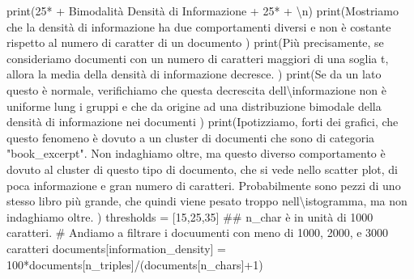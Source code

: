 \documentclass[
  italian,
  a4paper,
]{article}
\newenvironment{Shaded}{\begin{snugshade}}{\end{snugshade}}
\newcommand{\BuiltInTok}[1]{\textcolor[rgb]{0.00,0.23,0.31}{#1}}
\newcommand{\CharTok}[1]{\textcolor[rgb]{0.13,0.47,0.30}{#1}}
\newcommand{\CommentTok}[1]{\textcolor[rgb]{0.37,0.37,0.37}{#1}}
\newcommand{\DecValTok}[1]{\textcolor[rgb]{0.68,0.00,0.00}{#1}}
\newcommand{\NormalTok}[1]{\textcolor[rgb]{0.00,0.23,0.31}{#1}}
\newcommand{\OperatorTok}[1]{\textcolor[rgb]{0.37,0.37,0.37}{#1}}
\newcommand{\StringTok}[1]{\textcolor[rgb]{0.13,0.47,0.30}{#1}}
\begin{document}
\begin{Shaded}
\begin{Highlighting}[]
\BuiltInTok{print}\NormalTok{(}\DecValTok{25}\OperatorTok{*}\StringTok{\textquotesingle{}{-}\textquotesingle{}} \OperatorTok{+} \StringTok{\textquotesingle{} Bimodalità Densità di Informazione\textquotesingle{}} \OperatorTok{+} \DecValTok{25}\OperatorTok{*}\StringTok{\textquotesingle{}{-}\textquotesingle{}} \OperatorTok{+} \StringTok{\textquotesingle{}}\CharTok{\textbackslash{}n}\StringTok{\textquotesingle{}}\NormalTok{)}
\BuiltInTok{print}\NormalTok{(}\StringTok{\textquotesingle{}\textquotesingle{}\textquotesingle{}Mostriamo che la densità di informazione ha due comportamenti diversi e non è costante }
\StringTok{    rispetto al numero di caratter di un documento}
\StringTok{     \textquotesingle{}\textquotesingle{}\textquotesingle{}}\NormalTok{)}
\BuiltInTok{print}\NormalTok{(}\StringTok{\textquotesingle{}\textquotesingle{}\textquotesingle{}Più precisamente, se consideriamo documenti con un numero di caratteri }
\StringTok{    maggiori di una soglia t, allora la media della densità di informazione decresce.}
\StringTok{     \textquotesingle{}\textquotesingle{}\textquotesingle{}}\NormalTok{)}
\BuiltInTok{print}\NormalTok{(}\StringTok{\textquotesingle{}\textquotesingle{}\textquotesingle{}Se da un lato questo è normale, verifichiamo che questa decrescita dell}\CharTok{\textbackslash{}\textquotesingle{}}\StringTok{informazione }
\StringTok{    non è uniforme lung i gruppi e che da origine ad una distribuzione bimodale della densità }
\StringTok{    di informazione nei documenti}
\StringTok{     \textquotesingle{}\textquotesingle{}\textquotesingle{}}\NormalTok{)}
\BuiltInTok{print}\NormalTok{(}\StringTok{\textquotesingle{}\textquotesingle{}\textquotesingle{}Ipotizziamo, forti dei grafici, che questo fenomeno è dovuto a un cluster di documenti che sono di categoria "book\_excerpt". Non indaghiamo oltre, ma questo diverso comportamento è dovuto al cluster di}
\StringTok{    questo tipo di documento, che si vede nello scatter plot, di poca informazione e gran numero di caratteri. Probabilmente sono pezzi di uno stesso libro più grande, che quindi viene pesato troppo nell}\CharTok{\textbackslash{}\textquotesingle{}}\StringTok{istogramma, ma non indaghiamo oltre.}
\StringTok{     \textquotesingle{}\textquotesingle{}\textquotesingle{}}\NormalTok{)}
\NormalTok{thresholds }\OperatorTok{=}\NormalTok{ [}\DecValTok{15}\NormalTok{,}\DecValTok{25}\NormalTok{,}\DecValTok{35}\NormalTok{] }\CommentTok{\#\# n\_char è in unità di 1000 caratteri. }
\CommentTok{\# Andiamo a filtrare i docuumenti con meno di 1000, 2000, e 3000 caratteri }
\NormalTok{documents[}\StringTok{\textquotesingle{}information\_density\textquotesingle{}}\NormalTok{] }\OperatorTok{=} \DecValTok{100}\OperatorTok{*}\NormalTok{documents[}\StringTok{\textquotesingle{}n\_triples\textquotesingle{}}\NormalTok{]}\OperatorTok{/}\NormalTok{(documents[}\StringTok{\textquotesingle{}n\_chars\textquotesingle{}}\NormalTok{]}\OperatorTok{+}\DecValTok{1}\NormalTok{)}



\end{Highlighting}
\end{Shaded}
\end{document}
